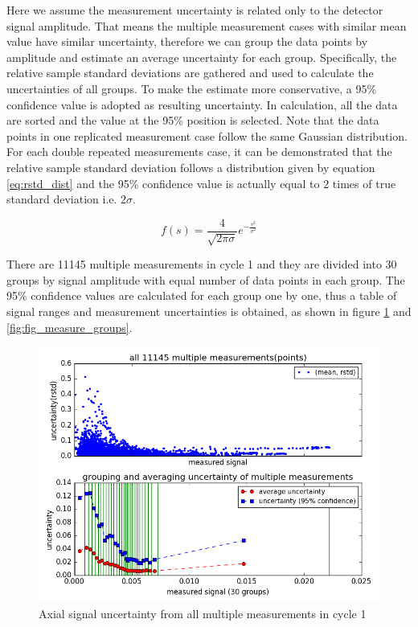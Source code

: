 \documentclass{article}
\begin{document}
Here we assume the measurement uncertainty is related only to the detector signal amplitude. That means the multiple measurement cases with similar mean value have similar uncertainty, therefore we can group the data points by amplitude and estimate an average uncertainty for each group. Specifically, the relative sample standard deviations are gathered and used to calculate the uncertainties of all groups. To make the estimate more conservative, a 95\% confidence value is adopted as resulting uncertainty. In calculation, all the data are sorted and the value at the 95\% position is selected. Note that the data points in one replicated measurement case follow the same Gaussian distribution. For each double repeated measurements case, it can be demonstrated that the relative sample standard deviation follows a distribution given by equation \ref{eq:rstd_dist} and the 95\% confidence value is actually equal to 2 times of true standard deviation i.e. $2\sigma$.

\begin{equation}
\label{eq:rstd_dist}
  f(s) = \frac{4}{\sqrt{2\pi\sigma}}e^{-\frac{s^2}{{\sigma}^2}}
\end{equation}

There are 11145 multiple measurements in cycle 1 and they are divided into 30 groups by signal amplitude with equal number of data points in each group. The 95\% confidence values are calculated for each group one by one, thus a table of signal ranges and measurement uncertainties is obtained, as shown in figure \ref{fig:fig_multi_measure_all} and \ref{fig:fig_measure_groups}.

\begin{figure}[ht]
\centering
\includegraphics[keepaspectratio, width = 4.5 in]{figures/flux_map_uncertainties/multi_measure_all.png}
\caption{Axial signal uncertainty from all multiple measurements in cycle 1}
\label{fig:fig_multi_measure_all}
\end{figure}
\end{document}
